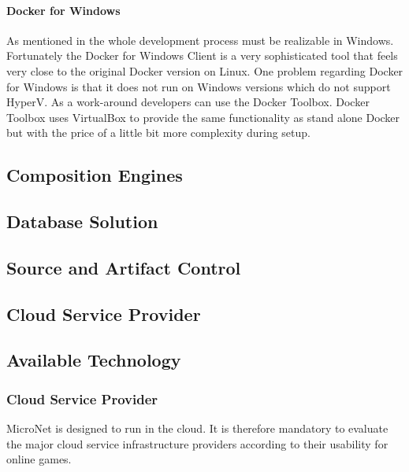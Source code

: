 \paragraph{Docker for Windows}

As mentioned in  the whole \og{} development
process must be realizable in Windows. Fortunately the Docker for Windows Client
is a very sophisticated tool that feels very close to the original Docker
version on Linux. One problem regarding Docker for Windows is that it does not
run on Windows versions which do not support HyperV. As a work-around developers
can use the Docker Toolbox. Docker Toolbox uses VirtualBox to provide the
same functionality as stand alone Docker but with the price of a little bit more
complexity during setup.

\subsection{Composition Engines}
\label{sub:composition_engines}

\subsection{Database Solution}
\subsection{Source and Artifact Control}
\subsection{Cloud Service Provider}










\subsection{Available Technology}

\subsubsection{Cloud Service Provider}

MicroNet is designed to run in the cloud. It is therefore mandatory to evaluate
the major cloud service infrastructure providers according to their usability
for online games.


